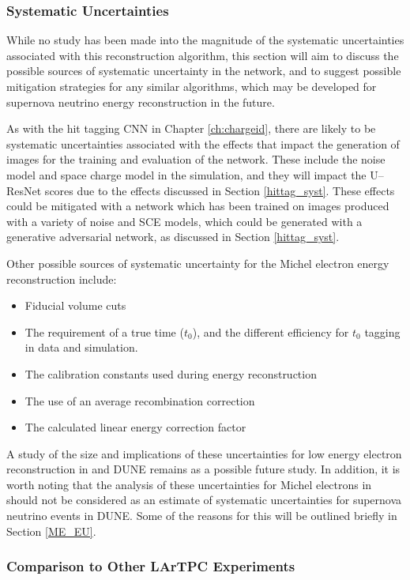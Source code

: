 \subsubsection*{Systematic Uncertainties}

While no study has been made into the magnitude of the systematic 
uncertainties associated with this reconstruction algorithm, this section will 
aim to discuss the possible sources of systematic uncertainty in the network, 
and to suggest possible mitigation strategies for any similar algorithms, 
which may be developed for supernova neutrino energy reconstruction in the 
future. 

As with the hit tagging CNN in Chapter \ref{ch:chargeid}, there are likely to be
systematic uncertainties associated with the effects that impact the generation
of images for the training and evaluation of the network. These include the
noise model and space charge model in the simulation, and they will impact the
U--ResNet scores due to the effects discussed in Section \ref{hittag_syst}.
These effects could be mitigated with a network which has been trained on images
produced with a variety of noise and SCE models, which could be generated with 
a generative adversarial network, as discussed in Section \ref{hittag_syst}.

Other possible sources of systematic uncertainty for the Michel electron energy
reconstruction include:
\begin{itemize}
	\item Fiducial volume cuts
	\item The requirement of a true time ($t_0$), and the different efficiency for
		$t_0$ tagging in data and simulation.
	\item The calibration constants used during energy reconstruction
	\item The use of an average recombination correction 
	\item The calculated linear energy correction factor 
\end{itemize}
A study of the size and implications of these uncertainties for low energy
electron reconstruction in \protodune{} and DUNE remains as a possible future
study. In addition, it is worth noting that the analysis of these 
uncertainties for Michel electrons in \protodune{} should not be considered as 
an estimate of systematic uncertainties for supernova neutrino events in 
DUNE. Some of the reasons for this will be outlined briefly in Section 
\ref{ME_EU}.

\subsubsection*{Comparison to Other LArTPC Experiments} \label{ME_COMP}

